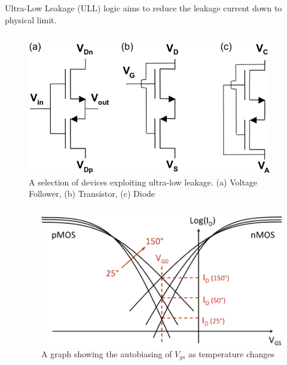 Ultra-Low Leakage (ULL) logic aims to reduce the leakage current down to physical limit.

\begin{columns}
	\begin{column}{0.5\textwidth}
		\begin{figure}
			\centering
			\includegraphics[width=\columnwidth]{../../images/ULLdevices.png}
			\caption{A selection of devices exploiting ultra-low leakage. (a) Voltage Follower, (b) Transistor, (c) Diode \cite{DisruptiveULL}}
			\label{fig:ulldevices}
		\end{figure}
	\end{column}
	\begin{column}{0.5\textwidth}
	\end{column}
\end{columns}

\begin{columns}
	\begin{column}{0.5\textwidth}
	\end{column}
	\begin{column}{0.5\textwidth}
\begin{figure}
	\centering
	\includegraphics[width=\columnwidth]{../../images/intersectiongraph.png}
	\caption{A graph showing the autobiasing of $V_{gs}$ as temperature changes \cite{DisruptiveULL}}
	\label{fig:ullintersect}
\end{figure}
	\end{column}
\end{columns}

